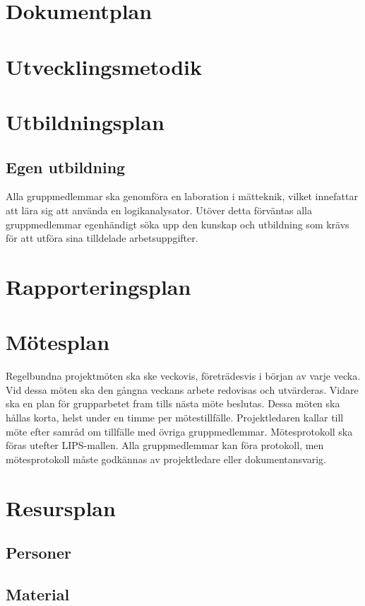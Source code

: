 \documentclass[a4paper,11pt]{article}
\begin{document}
\section{Dokumentplan}

\section{Utvecklingsmetodik}

\section{Utbildningsplan}
\subsection{Egen utbildning}
Alla gruppmedlemmar ska genomföra en laboration i mätteknik, vilket innefattar att lära sig att använda en logikanalysator. Utöver detta förväntas alla gruppmedlemmar egenhändigt söka upp den kunskap och utbildning som krävs för att utföra sina tilldelade arbetsuppgifter.

\section{Rapporteringsplan}

\section{Mötesplan}
Regelbundna projektmöten ska ske veckovis, företrädesvis i början av varje vecka. Vid dessa möten ska den gångna veckans arbete redovisas och utvärderas. Vidare ska en plan för grupparbetet fram tills nästa möte beslutas. Dessa möten ska hållas korta, helst under en timme per mötestillfälle. Projektledaren kallar till möte efter samråd om tillfälle med övriga gruppmedlemmar. Mötesprotokoll ska föras utefter LIPS-mallen. Alla gruppmedlemmar kan föra protokoll, men mötesprotokoll måste godkännas av projektledare eller dokumentansvarig.

\section{Resursplan}
\subsection{Personer}
\subsection{Material}
\end{document}
